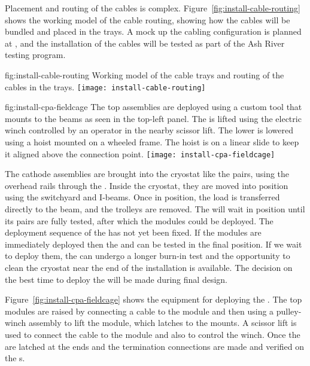 Placement and routing of the cables is complex. 
Figure~\ref{fig:install-cable-routing} shows the working \threed model of the cable routing, showing how the cables will be bundled and placed in the trays. 
A mock up the cabling configuration is planned at , and the installation of the cables will be tested as part of the Ash River testing program.

\begin{dunefigure}{fig:install-cable-routing}
  {Working model of the cable trays and routing of the  cables in the trays.}
\texttt{[image: install-cable-routing]}
\end{dunefigure}


\begin{dunefigure}{fig:install-cpa-fieldcage}
  {The top  assemblies are deployed using a custom tool that mounts to the  beams as seen in the top-left panel. The   is lifted using the electric winch controlled by an operator in the nearby scissor lift. The lower   is lowered using a hoist mounted on a wheeled frame. The hoist is on a linear slide to keep it aligned above the connection point.}
\texttt{[image: install-cpa-fieldcage]}
\end{dunefigure}

The cathode  assemblies are brought into the cryostat like the  pairs, using the overhead rails through the . 
Inside the cryostat, they are moved into position using the  switchyard and  I-beams. 
Once in position, the load is transferred directly to the  beam, and the trolleys are removed. 
The  will wait in position until its  pairs are fully tested, after which the  modules could be deployed. 
The deployment sequence of the  has not yet been fixed. 
If the  modules are immediately deployed then the  and  can be tested in the final position. 
If we wait to deploy them, the  can undergo a longer burn-in test and the opportunity to clean the cryostat near the end of the installation is available. 
The decision on the best time to deploy the  will be made during final design.

Figure~\ref{fig:install-cpa-fieldcage} shows the equipment for deploying the . 
The top  modules are raised by connecting a cable to the module and then using a pulley-winch assembly to lift the module, which latches to the  mounts. 
A scissor lift is used to connect the cable to the module and also to control the winch. 
Once the  are latched at the  ends and the  termination connections are made and verified on the s.


